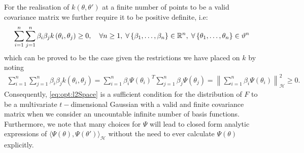 For the realisation of $k\left(\theta,\theta'\right)$ at a finite number of points to be a valid covariance matrix we further require it to be positive definite, i.e:
\begin{align}
\label{eq:opt:posDef}
\sum_{i=1}^{n} \sum_{j=1}^{n} \beta_i \beta_j k\left(\theta_i,\theta_j\right) \ge 0, \quad \forall n \ge 1, \; \forall \left\{\beta_1, \dots, \beta_n \right\}  \in \mathbb{R}^n, \; \forall \left\{\theta_1, \dots, \theta_n \right\} \in \vartheta^n
\end{align}
which can be proved to be the case given the restrictions we have placed on $k$ by noting
\begin{align}
\label{eq:opt:posDefProof}
\sum_{i=1}^{n} \sum_{j=1}^{n} \beta_i \beta_j k\left(\theta_i,\theta_j\right) = \sum_{i=1}^{n} \beta_i {\Psi\left(\theta_i\right)}^T \sum_{j=1}^{n} \beta_j \Psi\left(\theta_j\right) = \left\lVert \sum_{i=1}^{n} \beta_i \Psi\left(\theta_i\right) \right\rVert^2_\mathcal{H} \ge 0.
\end{align}
Consequently, \eqref{eq:opt:l2Space} is a sufficient condition for the distribution of $F$ to be a multivariate $t-$dimensional Gaussian with a valid and finite covariance matrix when we consider an uncountable infinite number of basis functions.  Furthermore, we note that many choices for $\Psi$ will lead to closed form analytic expressions of $\langle\Psi\left(\theta\right), \Psi\left(\theta'\right)\rangle_{\mathcal{H}}$ without the need to ever calculate $\Psi\left(\theta\right)$ explicitly.  

